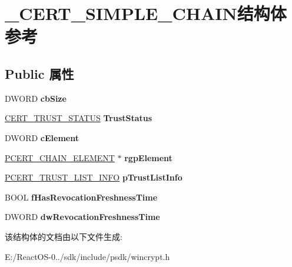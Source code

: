 \hypertarget{struct___c_e_r_t___s_i_m_p_l_e___c_h_a_i_n}{}\section{\+\_\+\+C\+E\+R\+T\+\_\+\+S\+I\+M\+P\+L\+E\+\_\+\+C\+H\+A\+I\+N结构体 参考}
\label{struct___c_e_r_t___s_i_m_p_l_e___c_h_a_i_n}
\subsection*{Public 属性}
\begin{DoxyCompactItemize}
\item 
\mbox{\label{struct___c_e_r_t___s_i_m_p_l_e___c_h_a_i_n_a35aae529a1df9d589d675cf933897126}} 
D\+W\+O\+RD {\bfseries cb\+Size}
\item 
\mbox{\label{struct___c_e_r_t___s_i_m_p_l_e___c_h_a_i_n_aa5913c02ecb333037b0a15ec44057546}} 
\hyperlink{struct___c_e_r_t___t_r_u_s_t___s_t_a_t_u_s}{C\+E\+R\+T\+\_\+\+T\+R\+U\+S\+T\+\_\+\+S\+T\+A\+T\+US} {\bfseries Trust\+Status}
\item 
\mbox{\label{struct___c_e_r_t___s_i_m_p_l_e___c_h_a_i_n_a0b4333cc650a452a325d5640183f35a1}} 
D\+W\+O\+RD {\bfseries c\+Element}
\item 
\mbox{\label{struct___c_e_r_t___s_i_m_p_l_e___c_h_a_i_n_abc487f37c508e4f6608b37628c6fdea5}} 
\hyperlink{struct___c_e_r_t___c_h_a_i_n___e_l_e_m_e_n_t}{P\+C\+E\+R\+T\+\_\+\+C\+H\+A\+I\+N\+\_\+\+E\+L\+E\+M\+E\+NT} $\ast$ {\bfseries rgp\+Element}
\item 
\mbox{\label{struct___c_e_r_t___s_i_m_p_l_e___c_h_a_i_n_ad1042929fd50b6799ad8fb58e310998c}} 
\hyperlink{struct___c_e_r_t___t_r_u_s_t___l_i_s_t___i_n_f_o}{P\+C\+E\+R\+T\+\_\+\+T\+R\+U\+S\+T\+\_\+\+L\+I\+S\+T\+\_\+\+I\+N\+FO} {\bfseries p\+Trust\+List\+Info}
\item 
\mbox{\label{struct___c_e_r_t___s_i_m_p_l_e___c_h_a_i_n_a4b5aaccfaa3a2eee3ff00743da71908a}} 
B\+O\+OL {\bfseries f\+Has\+Revocation\+Freshness\+Time}
\item 
\mbox{\label{struct___c_e_r_t___s_i_m_p_l_e___c_h_a_i_n_a9032145dfb604bd2e4bdd5dd4c4c68ea}} 
D\+W\+O\+RD {\bfseries dw\+Revocation\+Freshness\+Time}
\end{DoxyCompactItemize}


该结构体的文档由以下文件生成\+:\begin{DoxyCompactItemize}
\item 
E\+:/\+React\+O\+S-\/0../sdk/include/psdk/wincrypt.\+h\end{DoxyCompactItemize}
